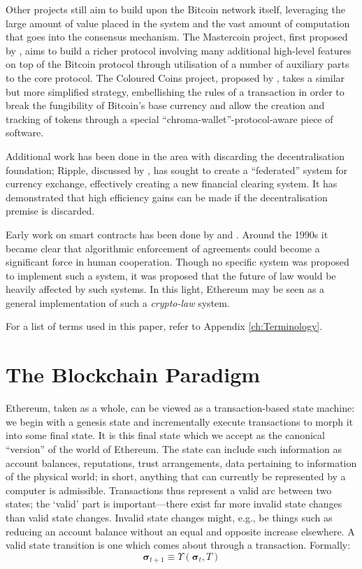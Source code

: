 \documentclass[9pt,oneside]{amsart}
\makeatletter
\newcommand*\eg{e.g.\@\xspace}
\makeatother
\begin{document}
\begin{multicols}{2}
Other projects still aim to build upon the Bitcoin network itself, leveraging the large amount of value placed in the system and the vast amount of computation that goes into the consensus mechanism. The Mastercoin project, first proposed by \cite{mastercoin2013willett}, aims to build a richer protocol involving many additional high-level features on top of the Bitcoin protocol through utilisation of a number of auxiliary parts to the core protocol. The Coloured Coins project, proposed by \cite{colouredcoins2012rosenfeld}, takes a similar but more simplified strategy, embellishing the rules of a transaction in order to break the fungibility of Bitcoin's base currency and allow the creation and tracking of tokens through a special ``chroma-wallet''-protocol-aware piece of software.

Additional work has been done in the area with discarding the decentralisation foundation; Ripple, discussed by \cite{boutellier2014pirates}, has sought to create a ``federated'' system for currency exchange, effectively creating a new financial clearing system. It has demonstrated that high efficiency gains can be made if the decentralisation premise is discarded.

Early work on smart contracts has been done by \cite{szabo1997formalizing} and \cite{miller1997future}. Around the 1990s it became clear that algorithmic enforcement of agreements could become a significant force in human cooperation. Though no specific system was proposed to implement such a system, it was proposed that the future of law would be heavily affected by such systems. In this light, Ethereum may be seen as a general implementation of such a \textit{crypto-law} system.

For a list of terms used in this paper, refer to Appendix \ref{ch:Terminology}.

\section{The Blockchain Paradigm} \label{ch:overview}

Ethereum, taken as a whole, can be viewed as a transaction-based state machine: we begin with a genesis state and incrementally execute transactions to morph it into some final state. It is this final state which we accept as the canonical ``version'' of the world of Ethereum. The state can include such information as account balances, reputations, trust arrangements, data pertaining to information of the physical world; in short, anything that can currently be represented by a computer is admissible. Transactions thus represent a valid arc between two states; the `valid' part is important---there exist far more invalid state changes than valid state changes. Invalid state changes might, \eg, be things such as reducing an account balance without an equal and opposite increase elsewhere. A valid state transition is one which comes about through a transaction. Formally:
\begin{equation}
\boldsymbol{\sigma}_{t+1} \equiv \Upsilon(\boldsymbol{\sigma}_t, T)
\end{equation}


\end{multicols}
\end{document}
